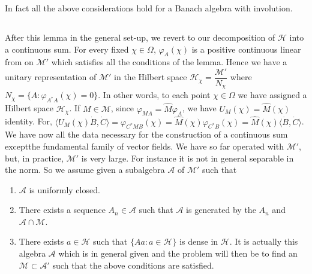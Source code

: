 In fact all the above considerations hold for a Banach algebra with
involution. 

\subsection{}\label{partIII-chap2-sec2.3}

After this lemma in the general set-up, we revert to our decomposition
of $\mathscr{H}$ into a continuous sum. For every fixed $\chi \in \Omega$,
$\varphi_A (\chi)$ is a positive continuous linear from on
$\mathscr{M}'$ which 
satisfies all the conditions of the lemma. Hence we have a unitary
representation of $\mathscr{M}'$ in the Hilbert space $\mathscr{H}_\chi
=\dfrac{\mathscr{M}'}{N_\chi}$ where $N_\chi =\{A : \varphi_{A^\ast
  A}(\chi)=0\}$. In other words, to each point $\chi \in \Omega$ we have
assigned a Hilbert space $\mathscr{H}_\chi$. If $M \in \mathscr{M}$, since
$\varphi_{MA}=\hat{M}\varphi_A$, we have $U_M (\chi)=\hat{M}(\chi)$ 
identity. For,
$\langle U_M (\chi)\dot{B},\dot{C}\rangle = \varphi_{C^\ast
  MB}(\chi)=\hat{M}(\chi) \varphi_{C^\ast B}(\chi)=\hat{M}(\chi) \langle
\dot{B},\dot{C}\rangle$. We have now all the data necessary for the
construction of a continuous sum except\pageoriginale the fundamental
family of 
vector fields. We have so far operated with $\mathscr{M}'$, but, in practice, $
\mathscr{M}'$ is very large. For instance it is not in general separable in the
norm. So we assume given a subalgebra $\mathcal{A}$ of $\mathscr{M}'$ such that 
\begin{enumerate}
\renewcommand{\theenumi}{\alph{enumi}}
\renewcommand{\labelenumi}{(\theenumi)}
\item $\mathcal{A}$ is uniformly closed.

\item There exists a sequence $A_n \in \mathcal{A}$ such that
  $\mathcal{A}$ is generated by the $A_n$ and $\mathcal{A}\cap \mathscr{M}$. 

\item There exists  $a \in \mathscr{H}$ such that $\{ Aa:a \in
  \mathscr{H} \}$ is dense in $\mathscr{H}$. It is actually this
  algebra $\mathcal{A}$ which is in general given and the problem will
  then be to find an $\mathscr{M}\subset \mathcal{A}'$ such that the
  above conditions are satisfied. 
\end{enumerate}

